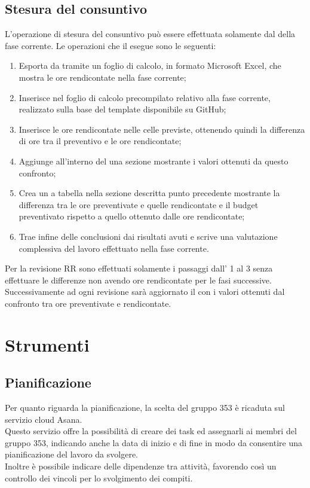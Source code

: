 \documentclass[NormeDiProgetto.tex]{subfiles}
\begin{document}
	\subsection{Stesura del consuntivo}
	L’operazione di stesura del consuntivo può essere effettuata solamente dal \respdiprog{} della fase corrente.
	Le operazioni che il \respdiprog{} esegue sono le seguenti:
	\begin{enumerate}
		\item Esporta da  tramite  un foglio di calcolo, in formato Microsoft Excel, che mostra le ore rendicontate nella fase corrente;
		\item Inserisce nel foglio di calcolo precompilato relativo alla fase corrente, realizzato sulla base del template disponibile su GitHub;
		\item Inserisce le ore rendicontate nelle celle previste, ottenendo quindi la differenza di ore tra il preventivo e le ore rendicontate;
		\item Aggiunge all'interno del \pdp{} una sezione mostrante i valori ottenuti da questo confronto;
		\item Crea un a tabella nella sezione descritta punto precedente mostrante la differenza tra le ore preventivate e quelle rendicontate e il budget preventivato rispetto a quello ottenuto dalle ore rendicontate;
		\item Trae infine delle conclusioni dai risultati avuti e scrive una valutazione complessiva	del lavoro effettuato nella fase corrente.
	\end{enumerate}
	Per la revisione RR sono effettuati solamente i passaggi dall' 1 al 3 senza effettuare le differenze non avendo ore rendicontate per le fasi successive. Successivamente ad ogni revisione sarà aggiornato il \pdp{} con i valori ottenuti dal confronto tra ore preventivate e rendicontate. 
	
	\section{Strumenti}	
	\subsection{Pianificazione} Per quanto riguarda la pianificazione, la scelta del gruppo 353 è ricaduta sul servizio cloud Asana.\\
	Questo servizio offre la possibilità di creare dei task ed assegnarli ai membri del gruppo 353, indicando anche la data di inizio e di fine in modo da consentire una pianificazione del lavoro da svolgere.\\
	Inoltre è possibile indicare delle dipendenze tra attività, favorendo così un controllo dei vincoli per lo svolgimento dei compiti.\\
\end{document}
